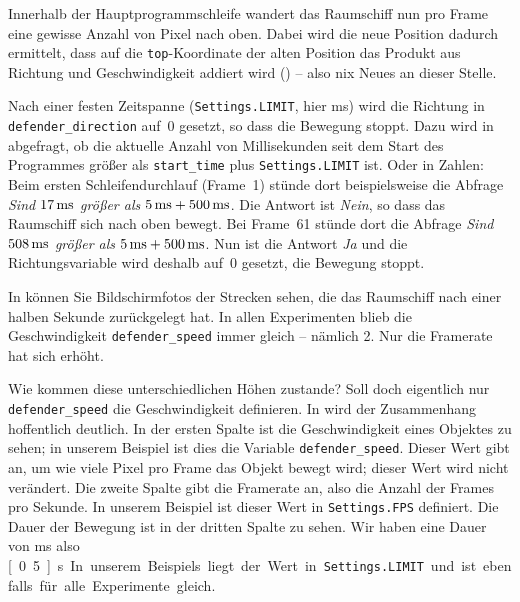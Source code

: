 Innerhalb der Hauptprogrammschleife wandert das Raumschiff nun pro Frame eine gewisse Anzahl von Pixel nach oben. Dabei wird die neue Position dadurch ermittelt, dass auf die \texttt{top}-Koordinate der alten Position das Produkt aus Richtung und Geschwindigkeit addiert wird () -- also nix Neues an dieser Stelle.

Nach einer festen Zeitspanne (\texttt{Settings.LIMIT}, hier \unit[500]{ms}) wird die Richtung in \texttt{de\-fen\-der\_direction} auf~0 gesetzt, so dass die Bewegung stoppt. Dazu wird in  abgefragt, ob die aktuelle Anzahl von Millisekunden seit dem Start des Programmes größer als \texttt{start\_time} plus \texttt{Settings.LIMIT} ist. Oder in Zahlen: Beim ersten Schleifendurchlauf (Frame~1) stünde dort beispielsweise die Abfrage \emph{Sind $\unit[17]{ms}$ größer als $\unit[5]{ms} + \unit[500]{ms}$}. Die Antwort ist \emph{Nein}, so dass das Raumschiff sich nach oben bewegt. Bei Frame~61 stünde dort die Abfrage \emph{Sind $\unit[508]{ms}$ größer als $\unit[5]{ms} + \unit[500]{ms}$}. Nun ist die Antwort \emph{Ja} und die Richtungsvariable wird deshalb auf~0 gesetzt, die Bewegung stoppt.


In  können Sie Bildschirmfotos der Strecken sehen, die das Raumschiff nach einer halben Sekunde zurückgelegt hat. In allen Experimenten blieb die Geschwindigkeit \texttt{defender\_speed} immer gleich -- nämlich 2. Nur die Framerate hat sich erhöht.

Wie kommen diese unterschiedlichen Höhen zustande? Soll doch eigentlich nur \texttt{de\-fen\-der\-\_speed} die Geschwindigkeit definieren. In  wird der Zusammenhang hoffentlich deutlich. In der ersten Spalte ist die Geschwindigkeit eines Objektes zu sehen; in unserem Beispiel ist dies die Variable \texttt{defender\_speed}. Dieser Wert gibt an, um wie viele Pixel pro Frame das Objekt bewegt wird; dieser Wert wird nicht verändert. Die zweite Spalte gibt die Framerate an, also die Anzahl der Frames pro Sekunde. In unserem Beispiel ist dieser Wert in \texttt{Settings.FPS} definiert. Die Dauer der Bewegung ist in der dritten Spalte zu sehen. Wir haben eine Dauer von \unit[500]{ms} also \unit[0.5]{s}. In unserem Beispiels liegt der Wert in \texttt{Settings.LIMIT} und ist ebenfalls für alle Experimente gleich. 

